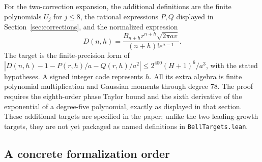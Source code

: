 For the two-correction expansion, the additional definitions are the finite
polynomials $U_j$ for $j\le8$, the rational expressions $P,Q$ displayed in
Section~\ref{sec:corrections}, and the normalized expression
\[
 D(n,h)=\frac{B_{n+h}r^{n+h}\sqrt{2\pi av}}{(n+h)!e^{a-1}}.
\]
The target is the finite-precision form of
$|D(n,h)-1-P(r,h)/a-Q(r,h)/a^2|\le2^{400}(H+1)^6/a^3$,
with the stated hypotheses. A signed integer code represents $h$.
All its extra algebra is finite polynomial multiplication and Gaussian
moments through degree $78$. The proof requires the eighth-order phase
Taylor bound and the sixth derivative of the exponential of a degree-five
polynomial, exactly as displayed in that section. These additional targets
are specified in the paper; unlike the two leading-growth targets, they
are not yet packaged as named definitions in \texttt{BellTargets.lean}.

\subsection{A concrete formalization order}

